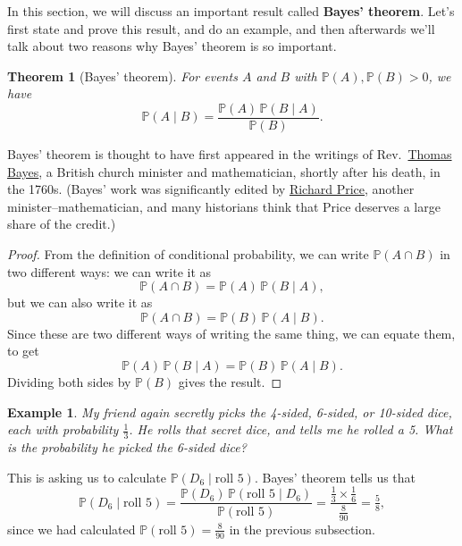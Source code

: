 \documentclass[
  a4paper,
]{book}
\newtheorem{theorem}{Theorem}[chapter]
\theoremstyle{definition}
\theoremstyle{definition}
\newtheorem{example}{Example}[chapter]
\theoremstyle{definition}
\theoremstyle{definition}
\theoremstyle{remark}
\begin{document}
In this section, we will discuss an important result called \textbf{Bayes' theorem}.
Let's first state and prove this result, and do an example, and then afterwards we'll talk about two reasons why Bayes' theorem is so important.

\begin{theorem}[Bayes' theorem]
\protect\hypertarget{thm:thbayes}{}\label{thm:thbayes}For events \(A\) and \(B\) with \(\mathbb P(A), \mathbb P(B) > 0\), we have
\[ \mathbb P(A \mid B) = \frac{\mathbb P(A) \,\mathbb P(B \mid A)}{\mathbb P(B)} .  \]
\end{theorem}

Bayes' theorem is thought to have first appeared in the writings of Rev.~\href{https://mathshistory.st-andrews.ac.uk/Biographies/Bayes/}{Thomas Bayes}, a British church minister and mathematician, shortly after his death, in the 1760s. (Bayes' work was significantly edited by \href{https://mathshistory.st-andrews.ac.uk/Biographies/Price/}{Richard Price}, another minister--mathematician, and many historians think that Price deserves a large share of the credit.)

\begin{proof}
From the definition of conditional probability, we can write \(\mathbb P(A \cap B)\) in two different ways: we can write it as
\[  \mathbb P(A \cap B) = \mathbb P(A) \, \mathbb P(B\mid A) , \]
but we can also write it as
\[  \mathbb P(A \cap B) = \mathbb P(B) \, \mathbb P(A\mid B) . \]
Since these are two different ways of writing the same thing, we can equate them, to get
\[ \mathbb P(A) \, \mathbb P(B\mid A) = \mathbb P(B) \, \mathbb P(A\mid B) . \]
Dividing both sides by \(\mathbb P(B)\) gives the result.
\end{proof}

\begin{example}
\emph{My friend again secretly picks the 4-sided, 6-sided, or 10-sided dice, each with probability \(\frac13\). He rolls that secret dice, and tells me he rolled a 5. What is the probability he picked the 6-sided dice?}

This is asking us to calculate \(\mathbb P(D_6 \mid \text{roll 5})\). Bayes' theorem tells us that
\[
  \mathbb P(D_6 \mid \text{roll 5})
  = \frac{\mathbb P(D_6) \, \mathbb P(\text{roll 5} \mid D_6)}{\mathbb P(\text{roll 5})} 
  = \frac{\frac13 \times \frac16}{\frac{8}{90}} 
  = \tfrac{5}{8} ,
\]
since we had calculated \(\mathbb P(\text{roll 5}) = \frac{8}{90}\) in the previous subsection.
\end{example}
\end{document}
